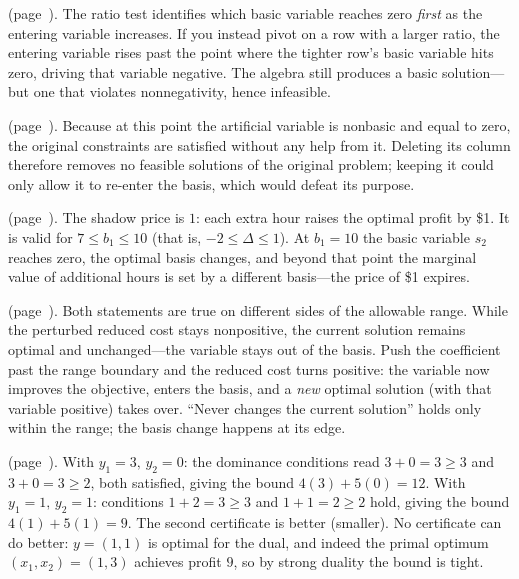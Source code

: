 \medskip

\noindent\textbf{} (page~\pageref{lc:ratio-test}).
The ratio test identifies which basic variable reaches zero \emph{first} as the entering variable increases. If you instead pivot on a row with a larger ratio, the entering variable rises past the point where the tighter row's basic variable hits zero, driving that variable negative. The algebra still produces a basic solution---but one that violates nonnegativity, hence infeasible.

\medskip

\noindent\textbf{} (page~\pageref{lc:artificial-removal}).
Because at this point the artificial variable is nonbasic and equal to zero, the original constraints are satisfied without any help from it. Deleting its column therefore removes no feasible solutions of the original problem; keeping it could only allow it to re-enter the basis, which would defeat its purpose.

\medskip

\noindent\textbf{} (page~\pageref{lc:shadow-price-b1}).
The shadow price is $1$: each extra hour raises the optimal profit by \$1. It is valid for $7 \le b_1 \le 10$ (that is, $-2 \le \Delta \le 1$). At $b_1 = 10$ the basic variable $s_2$ reaches zero, the optimal basis changes, and beyond that point the marginal value of additional hours is set by a different basis---the price of \$1 expires.

\medskip

\noindent\textbf{} (page~\pageref{lc:nonbasic-cost}).
Both statements are true on different sides of the allowable range. While the perturbed reduced cost stays nonpositive, the current solution remains optimal and unchanged---the variable stays out of the basis. Push the coefficient past the range boundary and the reduced cost turns positive: the variable now improves the objective, enters the basis, and a \emph{new} optimal solution (with that variable positive) takes over. ``Never changes the current solution'' holds only within the range; the basis change happens at its edge.

\medskip

\noindent\textbf{} (page~\pageref{lc:duality-certificate}).
With $y_1 = 3,\, y_2 = 0$: the dominance conditions read $3 + 0 = 3 \geq 3$ and $3 + 0 = 3 \geq 2$, both satisfied, giving the bound $4(3) + 5(0) = 12$. With $y_1 = 1,\, y_2 = 1$: conditions $1 + 2 = 3 \geq 3$ and $1 + 1 = 2 \geq 2$ hold, giving the bound $4(1) + 5(1) = 9$. The second certificate is better (smaller). No certificate can do better: $y = (1,1)$ is optimal for the dual, and indeed the primal optimum $(x_1, x_2) = (1,3)$ achieves profit $9$, so by strong duality the bound is tight.

